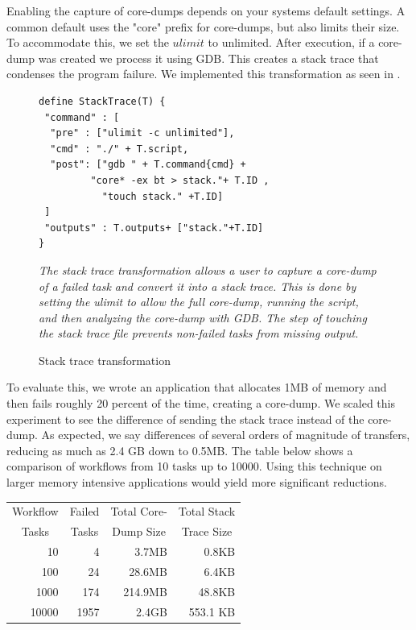 \documentclass[conference]{IEEEtran}
\begin{document}
Enabling the capture of core-dumps depends
on your systems default settings.
A common default uses the "core" prefix for
core-dumps, but also limits their size. 
To accommodate this, we set the $ulimit$
to unlimited. After execution, if a 
core-dump was created we process it using GDB.
This creates a stack trace that condenses
the program failure.
We implemented this transformation as 
seen in .

\begin{figure}[H]
\begin{framed}
\small
\begin{verbatim}
define StackTrace(T) {
 "command" : [
  "pre" : ["ulimit -c unlimited"],
  "cmd" : "./" + T.script,
  "post": ["gdb " + T.command{cmd} +
         "core* -ex bt > stack."+ T.ID ,
           "touch stack." +T.ID]
 ]
 "outputs" : T.outputs+ ["stack."+T.ID]
}
\end{verbatim}
\end{framed}
\caption{Stack trace transformation}
\small
\emph{The stack trace transformation allows a user
to capture a core-dump of a failed task and 
convert it into a stack trace. 
This is done by setting the ulimit 
to allow the full core-dump, running the script,
and then analyzing the core-dump with GDB.
The step of touching the stack trace
file prevents non-failed tasks from missing output.}
\label{stacktrace}
\end{figure}

To evaluate this,
we wrote an application that
allocates 1MB of memory and then
fails roughly 20 percent
of the time, creating a core-dump. 
We scaled this experiment to see the 
difference of sending the 
stack trace instead of the core-dump.
As expected, we say differences of
several orders of magnitude of transfers,
reducing as much as 2.4 GB down to 0.5MB.
The table below shows a comparison
of workflows from 10 tasks up to 10000.
Using this technique on larger memory
intensive applications would yield 
more significant reductions.

\begin{center}
\begin{tabular}{| r | r | r | r |}
\hline
\multicolumn{1}{|c|}{Workflow} & \multicolumn{1}{|c|}{Failed} & \multicolumn{1}{|c|}{Total Core-} & \multicolumn{1}{|c|}{Total Stack} \\
\multicolumn{1}{|c|}{Tasks}    & \multicolumn{1}{|c|}{Tasks}  & \multicolumn{1}{|c|}{Dump Size}  & \multicolumn{1}{|c|}{Trace Size} \\ \hline
10 & 4 & 3.7MB & 0.8KB \\ \hline
100 & 24 & 28.6MB & 6.4KB\\ \hline
1000 & 174 & 214.9MB & 48.8KB \\ \hline
10000 & 1957 & 2.4GB & 553.1 KB \\ \hline
\end{tabular}
\end{center}
\end{document}
